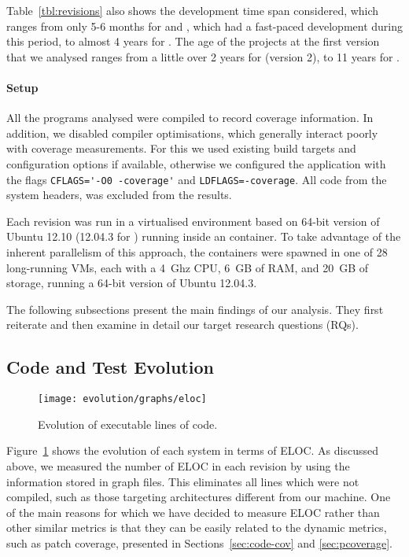 Table~\ref{tbl:revisions} also shows the development time span
considered, which ranges from only 5-6 months for \git and \redis,
which had a fast-paced development during this period, to almost 4
years for \memcached. The age of the projects at the first version
that we analysed ranges from a little over 2 years for \lighttpdtwo
(version 2), to 11 years for \binutils.

\paragraph{Setup} All the programs analysed were compiled to record coverage
information. In addition, we disabled compiler optimisations, which generally
interact poorly with coverage measurements. For this we used existing build
targets and configuration options if available, otherwise we configured the
application with the flags \lstinline`CFLAGS='-O0 -coverage'` and
\lstinline`LDFLAGS=-coverage`. All code from the system headers, \ie
{} was excluded from the results.

Each revision was run in a virtualised environment based on 64-bit version of
Ubuntu 12.10 (12.04.3 for \git) running inside an \lxc container.  To take
advantage of the inherent parallelism of this approach, the containers were
spawned in one of 28 long-running \xen VMs, each with a 4~Ghz CPU, 6~GB of RAM,
and 20~GB of storage, running a 64-bit version of Ubuntu 12.04.3.

The following subsections present the main findings of our analysis.  They
first reiterate and then examine in detail our target research questions (RQs).

\subsection{Code and Test Evolution}

\begin{figure}[t]
%
\texttt{[image: evolution/graphs/eloc]}
\caption{Evolution of executable lines of code.}
\label{fig:codebase-evol}
\end{figure}

\begin{question}
  \rqone
\end{question}

Figure~\ref{fig:codebase-evol} shows the evolution of each system in
terms of ELOC.  As discussed above, we measured the number of ELOC in
each revision by using the information stored in \gcov graph files.
This eliminates all lines which were not compiled, such as those
targeting architectures different from our machine.  One of the main
reasons for which we have decided to measure ELOC rather than other
similar metrics is that they can be easily related to the dynamic
metrics, such as patch coverage, presented in
Sections~\ref{sec:code-cov} and \ref{sec:pcoverage}.

